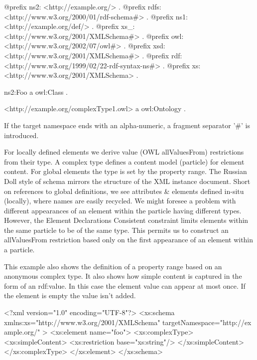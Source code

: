 \begin{DoxyCodeInclude}
@prefix ns2:     <http://example.org/> .
@prefix rdfs:    <http://www.w3.org/2000/01/rdf-schema#> .
@prefix ns1:     <http://example.org/def/> .
@prefix xs_:     <http://www.w3.org/2001/XMLSchema#> .
@prefix owl:     <http://www.w3.org/2002/07/owl#> .
@prefix xsd:     <http://www.w3.org/2001/XMLSchema#> .
@prefix rdf:     <http://www.w3.org/1999/02/22-rdf-syntax-ns#> .
@prefix xs:      <http://www.w3.org/2001/XMLSchema> .

ns2:Foo
      a       owl:Class .

<http://example.org/complexType1.owl>
      a       owl:Ontology .
\end{DoxyCodeInclude}


If the target namespace ends with an alpha-\/numeric, a fragment separator '\#' is introduced.

For locally defined elements we derive value (OWL allValuesFrom) restrictions from their type. A complex type defines a content model (particle) for element content. For global elements the type is set by the property range. The Russian Doll style of schema mirrors the structure of the XML instance document. Short on references to global definitions, we see attributes \& elements defined in-\/situ (locally), where names are easily recycled. We might foresee a problem with different appearances of an element within the particle having different types. However, the Element Declarations Consistent constraint limits elements within the same particle to be of the same type. This permits us to construct an allValuesFrom restriction based only on the first appearance of an element within a particle.

This example also shows the definition of a property range based on an anonymous complex type. It also shows how simple content is captured in the form of an rdf:value. In this case the element value can appear at most once. If the element is empty the value isn't added.


\begin{DoxyCodeInclude}
<?xml version="1.0" encoding="UTF-8"?>
<xs:schema xmlns:xs="http://www.w3.org/2001/XMLSchema" targetNamespace="http://ex
      ample.org/" >
        <xs:element name="foo">
                <xs:complexType>
                        <xs:simpleContent>
                                <xs:restriction base="xs:string"/>
                        </xs:simpleContent>
                </xs:complexType>
        </xs:element>
</xs:schema>
\end{DoxyCodeInclude}
 
